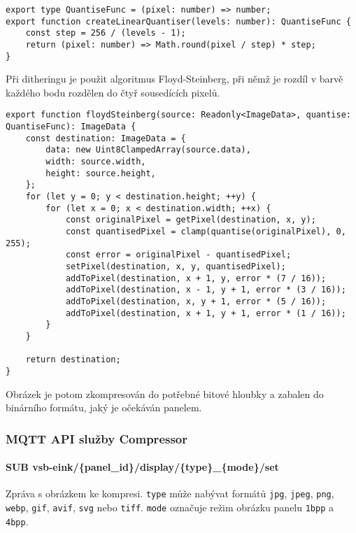 \begin{lstlisting}[label=src:quantise-func,caption={Implementace univerzální kvantizační funkce použité při kompresi barev obrázků}]
export type QuantiseFunc = (pixel: number) => number;
export function createLinearQuantiser(levels: number): QuantiseFunc {
	const step = 256 / (levels - 1);
	return (pixel: number) => Math.round(pixel / step) * step;
}
\end{lstlisting}

Při ditheringu je použit algoritmus Floyd-Steinberg, při němž je rozdíl v barvě každého bodu rozdělen do čtyř sousedících pixelů.

\begin{lstlisting}[label=src:floydsteinberg-func,caption={Implementace Floyd-Steinbergova dithering algoritmu}]
export function floydSteinberg(source: Readonly<ImageData>, quantise: QuantiseFunc): ImageData {
	const destination: ImageData = {
		data: new Uint8ClampedArray(source.data),
		width: source.width,
		height: source.height,
	};
	for (let y = 0; y < destination.height; ++y) {
		for (let x = 0; x < destination.width; ++x) {
			const originalPixel = getPixel(destination, x, y);
			const quantisedPixel = clamp(quantise(originalPixel), 0, 255);
			const error = originalPixel - quantisedPixel;
			setPixel(destination, x, y, quantisedPixel);
			addToPixel(destination, x + 1, y, error * (7 / 16));
			addToPixel(destination, x - 1, y + 1, error * (3 / 16));
			addToPixel(destination, x, y + 1, error * (5 / 16));
			addToPixel(destination, x + 1, y + 1, error * (1 / 16));
		}
	}

	return destination;
}
\end{lstlisting}

Obrázek je potom zkompresován do potřebné bitové hloubky a zabalen do binárního formátu, jaký je očekáván panelem.

\subsubsection{MQTT API služby Compressor}
\paragraph*{SUB vsb-eink/\{panel\_id\}/display/\{type\}\_\{mode\}/set}
Zpráva s obrázkem ke kompresi. \lstinline|type| může nabývat formátů \lstinline|jpg|, \lstinline|jpeg|, \lstinline|png|, \lstinline|webp|, \lstinline|gif|, \lstinline|avif|, \lstinline|svg| nebo \lstinline|tiff|. \lstinline|mode| označuje režim obrázku panelu \lstinline|1bpp| a \lstinline|4bpp|.

